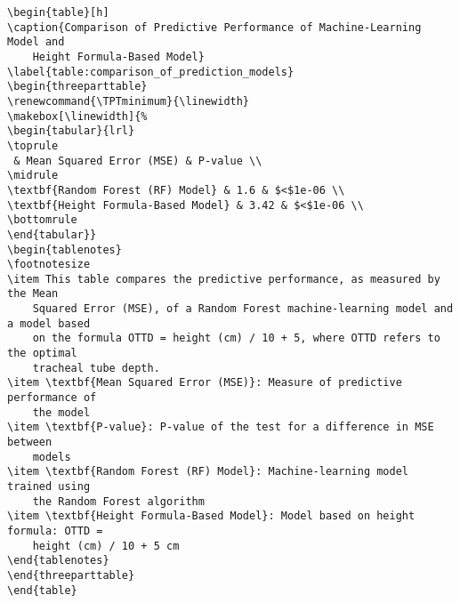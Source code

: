 \documentclass[11pt]{article}
\begin{document}
\begin{Verbatim}[tabsize=4]
\begin{table}[h]
\caption{Comparison of Predictive Performance of Machine-Learning Model and
	Height Formula-Based Model}
\label{table:comparison_of_prediction_models}
\begin{threeparttable}
\renewcommand{\TPTminimum}{\linewidth}
\makebox[\linewidth]{%
\begin{tabular}{lrl}
\toprule
 & Mean Squared Error (MSE) & P-value \\
\midrule
\textbf{Random Forest (RF) Model} & 1.6 & $<$1e-06 \\
\textbf{Height Formula-Based Model} & 3.42 & $<$1e-06 \\
\bottomrule
\end{tabular}}
\begin{tablenotes}
\footnotesize
\item This table compares the predictive performance, as measured by the Mean
	Squared Error (MSE), of a Random Forest machine-learning model and a model based
	on the formula OTTD = height (cm) / 10 + 5, where OTTD refers to the optimal
	tracheal tube depth.
\item \textbf{Mean Squared Error (MSE)}: Measure of predictive performance of
	the model
\item \textbf{P-value}: P-value of the test for a difference in MSE between
	models
\item \textbf{Random Forest (RF) Model}: Machine-learning model trained using
	the Random Forest algorithm
\item \textbf{Height Formula-Based Model}: Model based on height formula: OTTD =
	height (cm) / 10 + 5 cm
\end{tablenotes}
\end{threeparttable}
\end{table}

\end{Verbatim}
\end{document}
